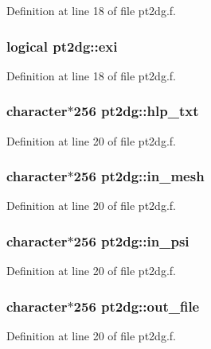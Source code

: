 Definition at line 18 of file pt2dg.f.\hypertarget{namespacept2dg_8d34f10ebcb05cf92fd9c45ef5fd2d21}{
\subsubsection[exi]{\setlength{\rightskip}{0pt plus 5cm}logical {\bf pt2dg::exi}}}
\label{namespacept2dg_8d34f10ebcb05cf92fd9c45ef5fd2d21}




Definition at line 18 of file pt2dg.f.\hypertarget{namespacept2dg_33f7cd692337d17317294fdb06b21913}{
\subsubsection[hlp\_\-txt]{\setlength{\rightskip}{0pt plus 5cm}character$\ast$256 {\bf pt2dg::hlp\_\-txt}}}
\label{namespacept2dg_33f7cd692337d17317294fdb06b21913}




Definition at line 20 of file pt2dg.f.\hypertarget{namespacept2dg_eda9f0cb998f1a0f90278f6e346b0078}{
\subsubsection[in\_\-mesh]{\setlength{\rightskip}{0pt plus 5cm}character$\ast$256 {\bf pt2dg::in\_\-mesh}}}
\label{namespacept2dg_eda9f0cb998f1a0f90278f6e346b0078}




Definition at line 20 of file pt2dg.f.\hypertarget{namespacept2dg_a7a9a6418c143ad919a63ee5a58cd4a9}{
\subsubsection[in\_\-psi]{\setlength{\rightskip}{0pt plus 5cm}character$\ast$256 {\bf pt2dg::in\_\-psi}}}
\label{namespacept2dg_a7a9a6418c143ad919a63ee5a58cd4a9}




Definition at line 20 of file pt2dg.f.\hypertarget{namespacept2dg_33730b097575dd7213ab08bcf86ffb0b}{
\subsubsection[out\_\-file]{\setlength{\rightskip}{0pt plus 5cm}character$\ast$256 {\bf pt2dg::out\_\-file}}}
\label{namespacept2dg_33730b097575dd7213ab08bcf86ffb0b}




Definition at line 20 of file pt2dg.f.